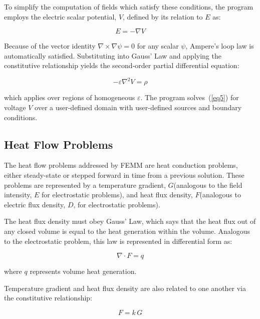 \documentclass[12pt]{report}
\begin{document}
To simplify the computation of fields which satisfy these conditions,
the program employs the electric scalar potential, $V$, defined by its relation to $E$ as:

\begin{equation}
\label{eq4}
E = - \nabla V
\end{equation}

Because of the vector identity $\nabla \times \nabla \psi = 0$ for any
scalar \textit{$\psi $}, Ampere's loop law is automatically satisfied. Substituting into
Gauss' Law and applying the constitutive relationship yields the
second-order partial differential equation:

\begin{equation}
\label{eq5}
 - \varepsilon \nabla ^2V = \rho
\end{equation}

\noindent
which applies over regions of homogeneous \textit{$\varepsilon $}.
The program solves~(\ref{eq5}) for voltage $V$ over a user-defined
domain with user-defined sources and boundary conditions.

\subsection{Heat Flow Problems}

The heat flow problems addressed by FEMM are heat conduction
problems, either steady-state or stepped forward in time from a
previous solution. These problems are represented by a
temperature gradient, $G$(analogous to the field intensity, $E$ for
electrostatic problems), and heat flux density, $F$(analogous to
electric flux density, $D$, for electrostatic problems).

The heat flux density must obey Gauss' Law, which says that the
heat flux out of any closed volume is equal to the heat generation
within the volume. Analogous to the electrostatic problem, this law
is represented in differential form as:

\begin{equation}
\label{eq1h}
\nabla \cdot F = q
\end{equation}

\noindent
where $q$ represents volume heat generation.

\noindent
Temperature gradient and heat flux density are also related to one
another via the constitutive relationship:

\begin{equation}
\label{eq3h}
F = k\,G
\end{equation}
\end{document}

